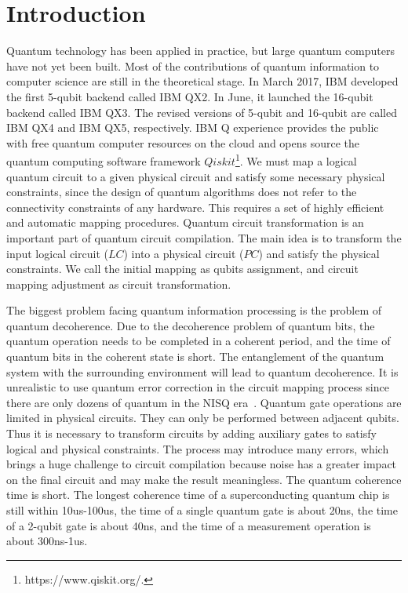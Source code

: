 \documentclass[runningheads]{llncs}
\begin{document}
\section{Introduction}
\label{Introduction}
Quantum technology has been applied in practice, but large quantum computers have not yet been built. Most of the contributions of quantum information to computer science are still in the theoretical stage. In March 2017, IBM developed the first 5-qubit backend called IBM QX2.  In June, it launched the 16-qubit backend called IBM QX3. The revised versions of 5-qubit and 16-qubit are called IBM QX4 and IBM QX5, respectively. IBM Q experience provides the public with free quantum computer resources on the cloud and opens source the quantum computing software framework $Qiskit$\footnote{https://www.qiskit.org/.}. We must map a logical quantum circuit to a given physical circuit and satisfy some necessary physical constraints, since the design of quantum algorithms does not refer to the connectivity constraints of any hardware. This requires a set of highly efficient and automatic mapping procedures. Quantum circuit transformation is an important part of quantum circuit compilation. The main idea is to transform the input logical circuit ($LC$) into a physical circuit ($PC$) and satisfy the physical constraints. We call the initial mapping as qubits assignment, and circuit mapping adjustment as circuit transformation.

The biggest problem facing quantum information processing is the problem of quantum decoherence. Due to the decoherence problem of quantum bits, the quantum operation needs to be completed in a coherent period, and the time of quantum bits in the coherent state is short. The entanglement of the quantum system with the surrounding environment will lead to quantum decoherence. It is unrealistic to use quantum error correction in the circuit mapping process since there are only dozens of quantum in the NISQ era~\cite{2018QuantumPreskill}. Quantum gate operations are limited in physical circuits. They can only be performed between adjacent qubits. Thus it is necessary to transform circuits by adding auxiliary gates to satisfy logical and physical constraints. The process may introduce many errors, which brings a huge challenge to circuit compilation because noise has a greater impact on the final circuit and may make the result meaningless. The quantum coherence time is short. The longest coherence time of a superconducting quantum chip is still within 10us-100us, the time of a single quantum gate is about 20ns, the time of a 2-qubit gate is about 40ns, and the time of a measurement operation is about 300ns-1us. 
\end{document}
